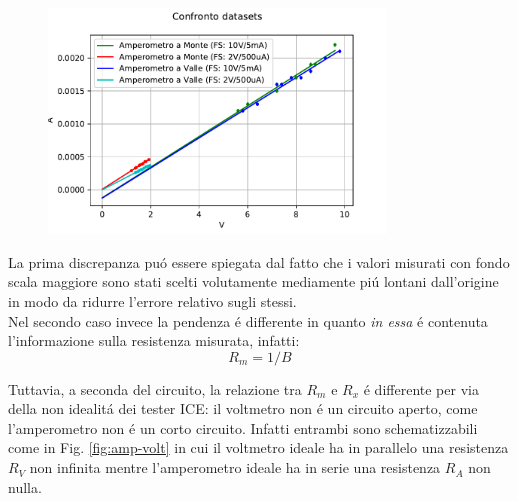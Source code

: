 \documentclass{article}
\begin{document}
\begin{figure}[ht]
	\centering
	\includegraphics[width=0.8\textwidth]{data/FigAll.pdf}
	\caption{\label{fig:confr}}
\end{figure}
\newpage
La prima discrepanza pu\'o essere spiegata dal fatto che i valori misurati con fondo scala maggiore sono stati scelti volutamente mediamente pi\'u lontani dall'origine in modo da ridurre l'errore relativo sugli stessi.\\
Nel secondo caso invece la pendenza \'e differente in quanto \textit{in essa} \'e contenuta l'informazione sulla resistenza misurata, infatti:
\begin{equation}
	R_m=1/B
\end{equation}

Tuttavia, a seconda del circuito, la relazione tra $R_m$ e $R_x$ \'e differente per via della non idealit\'a dei tester ICE: il voltmetro non \'e un circuito aperto, come l'amperometro non \'e un corto circuito. Infatti entrambi sono schematizzabili come in Fig. \ref{fig:amp-volt} in cui il voltmetro ideale ha in parallelo una resistenza $R_V$ non infinita mentre l'amperometro ideale ha in serie una resistenza $R_A$ non nulla.
\end{document}
